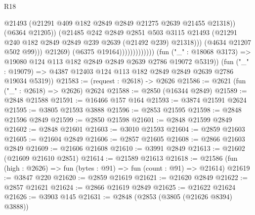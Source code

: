 \begin{lexlean}{R18}
\begin{coremodule}
                                            @21493
                                            (@21291
                                              @409
                                              @182
                                              @2849
                                              @2849
                                              @21275
                                              @2639
                                              @21455
                                              @21318))
                                          (@6364 @21205))
                                        (@21485
                                          @242
                                          @2849
                                          @2851
                                          @503
                                          @3115
                                          @21493
                                          (@21291
                                            @240
                                            @182
                                            @2849
                                            @2849
                                            @239
                                            @2639
                                            (@21492 @239)
                                            @21318)))
                                      (@4634 @21207 @502 @99)))
                                  @21269)
                                (@6375 @19164)))))))))))))
        (fun ("_" : @18068 @3173) => @19080 @124 @113 @182 @2849 @2849 @2639 @2786 @19072 @5319))
      (fun ("_" : @19079) => @4387 @12403 @124 @113 @182 @2849 @2849 @2639 @2786 @19034 @5319))
@21583 := (request : @2618) -> @2626
@21586 := @2621 (fun ("_" : @2618) => @2626) @2624
@21588 := @2850 (@16344 @2849)
@21589 := @2848 @21588
@21591 := @16466 @157 @164
@21593 := @3874 @21591 @2624
@21595 := @3805 @21593 @3888
@21596 := @2853 @21595
@21598 := @2848 @21596 @2849
@21599 := @2850 @21598
@21601 := @2848 @21599 @2849
@21602 := @2848 @21601
@21603 := @3010 @21593
@21604 := @2859 @21603
@21605 := @21604 @2849
@21606 := @2857 @21605
@21608 := @2866 @21603 @2849
@21609 := @21606 @21608
@21610 := @3991 @2849
@21613 := @21602 (@21609 @21610 @2851)
@21614 := @21589 @21613
@21618 := @21586 (fun (high : @2626) => fun (bytes : @91) => fun (count : @91) => @21614)
@21619 := @3847 @220
@21620 := @2859 @21619
@21621 := @21620 @2849
@21622 := @2857 @21621
@21624 := @2866 @21619 @2849
@21625 := @21622 @21624
@21626 := @3903 @145
@21631 := @2848 (@2853 (@3805 (@21626 @8394) @3888))

\end{coremodule}
\end{lexlean}
